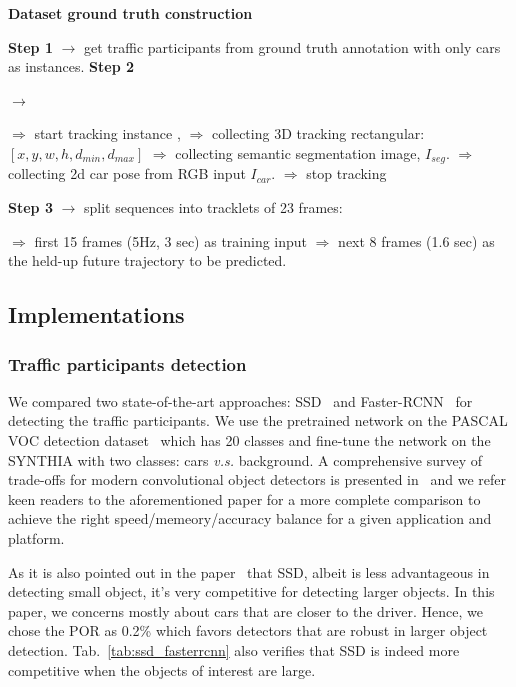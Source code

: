 \documentclass[10pt,twocolumn,letterpaper]{article}
\newlength\myindent
\newcommand\bindent[1][\myindent]{%
  \begingroup
  \setlength{\itemindent}{#1}
  \addtolength{\algorithmicindent}{#1}
}
\newcommand\eindent{\endgroup}
\begin{document}
\begin{algorithm}[h]
\begin{algorithmic}
\caption{\textbf{Dataset ground truth construction}}\label{list:dataset_collection}
\STATE \textbf{Step 1} $\rightarrow $ get traffic participants from ground truth annotation with only cars as instances.
\STATE \textbf{Step 2} {$\rightarrow $ {
\bindent
    \STATE $\Rightarrow$ start tracking instance ,
    \STATE $\Rightarrow$ collecting 3D tracking rectangular: $[x, y, w, h, d_{min}, d_{max}]$
    \STATE $\Rightarrow$ collecting semantic segmentation image, $I_{seg}$.
    \STATE $\Rightarrow$ collecting 2d car pose from RGB input $I_{car}$.
    \STATE $\Rightarrow$ stop tracking
    \ENDIF\eindent}
  }
\STATE \textbf{Step 3} $\rightarrow $ split sequences into tracklets of 23 frames:
{\bindent
    \STATE $\Rightarrow$  first 15 frames (5Hz, 3 sec) as training input
    \STATE $\Rightarrow$  next 8 frames (1.6 sec) as the held-up future trajectory to be predicted.
\eindent}
\end{algorithmic}
\end{algorithm}

\subsection{Implementations}\label{sec:Implementations}

\subsubsection{Traffic participants detection}

We compared two state-of-the-art approaches: SSD~\cite{liu2016ssd} and Faster-RCNN~\cite{ren2015faster} for detecting the traffic participants.
We use the pretrained network on the PASCAL VOC detection dataset~\cite{everingham2015pascal} which has 20 classes and fine-tune the network on the SYNTHIA with two classes: cars \emph{v.s.} background.
A comprehensive survey of trade-offs for modern convolutional object detectors is presented in~\cite{huang2017speed} and we refer keen readers to the aforementioned paper for a more complete comparison to achieve the right speed/memeory/accuracy balance for a given application and platform.

As it is also pointed out in the paper~\cite{huang2017speed} that SSD, albeit is less advantageous in detecting small object, it's very competitive for detecting larger objects. In this paper, we concerns mostly about cars that are closer to the driver. Hence, we chose the POR as 0.2\% which favors detectors that are robust in larger object detection.
Tab.~\ref{tab:ssd_fasterrcnn} also verifies that SSD is indeed more competitive when the objects of interest are large.
\end{document}
